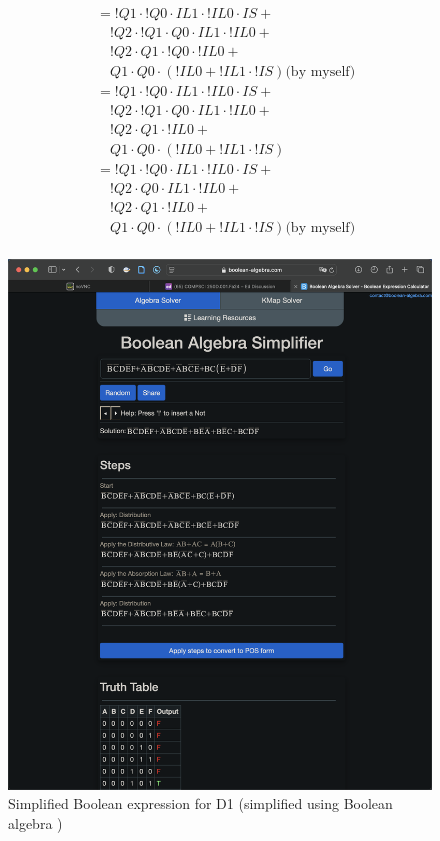 \begin{multicols}{2}
    \begin{align*}
        &=     !Q1 \cdot !Q0 \cdot  IL1 \cdot !IL0 \cdot  IS + \\
        &\quad !Q2 \cdot !Q1 \cdot  Q0 \cdot  IL1 \cdot !IL0 + \\
        &\quad !Q2 \cdot  Q1 \cdot !Q0 \cdot !IL0 + \\
        &\quad  Q1 \cdot  Q0 \cdot (!IL0 + !IL1 \cdot !IS)  \text{(by myself)}\\
    &=     !Q1 \cdot !Q0 \cdot  IL1 \cdot !IL0 \cdot  IS + \\
    &\quad !Q2 \cdot !Q1 \cdot  Q0 \cdot  IL1 \cdot !IL0 + \\
    &\quad !Q2 \cdot  Q1 \cdot !IL0 + \\
    &\quad  Q1 \cdot  Q0 \cdot (!IL0 + !IL1 \cdot !IS) \\
        &=     !Q1 \cdot !Q0 \cdot  IL1 \cdot !IL0 \cdot  IS + \\
        &\quad !Q2 \cdot  Q0 \cdot  IL1 \cdot !IL0 + \\
        &\quad !Q2 \cdot  Q1 \cdot !IL0 + \\
        &\quad  Q1 \cdot  Q0 \cdot (!IL0 + !IL1 \cdot !IS) \text{(by myself)}\\
    \end{align*}
    \columnbreak
    \begin{figure}[H]
        \centering
        \includegraphics[width=0.66\linewidth]{figures/D1simp.png}
        \caption{Simplified Boolean expression for D1 (simplified using Boolean algebra \cite{boolean-algebra})}
    \end{figure}
\end{multicols}


